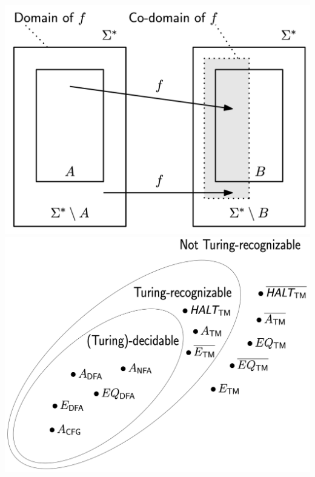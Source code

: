 \documentclass[9pt, twocolumn]{extarticle}
\begin{document}
\begin{center}
  \includegraphics[width=0.80\columnwidth]{assets/f.png}
  \includegraphics[width=0.95\columnwidth]{assets/turing-classes.png}
\end{center}
\end{document}
